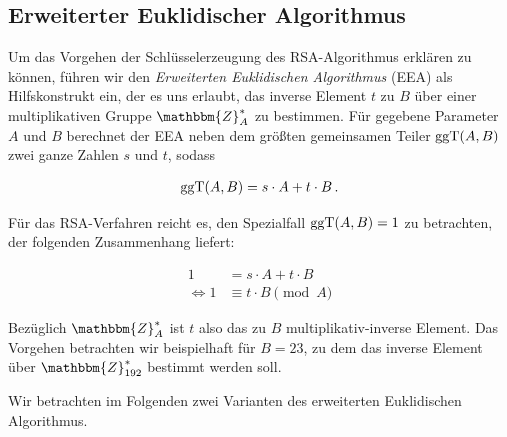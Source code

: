 \subsection{Erweiterter Euklidischer Algorithmus}
\label{ssec:eea}
Um das Vorgehen der Schlüsselerzeugung des RSA-Algorithmus erklären zu
können, führen wir den \emph{Erweiterten Euklidischen Algorithmus} (EEA)
als Hilfskonstrukt ein, der es uns erlaubt, das inverse Element $t$ zu
$B$ über einer multiplikativen Gruppe $\mathbbm{Z}^{\ast}_{A}$ zu
bestimmen. Für gegebene Parameter $A$ und $B$ berechnet der EEA neben
dem größten gemeinsamen Teiler $\operatorname{ggT}(A, B)$ zwei ganze Zahlen $s$ und $t$, sodass 

\begin{align*}
	\operatorname{ggT}(A, B) = s \cdot A + t \cdot B\, .
\end{align*}

Für das RSA-Verfahren reicht es, den Spezialfall $\operatorname{ggT}(A,B) = 1$ zu betrachten, der folgenden Zusammenhang liefert:

\begin{align*}
	1 &= s \cdot A + t \cdot B\\
	\Leftrightarrow 1 &\equiv t \cdot B \pmod A
\end{align*}

Bezüglich $\mathbbm{Z}^*_{A}$ ist $t$ also das zu $B$
multiplikativ-inverse Element. Das Vorgehen betrachten wir beispielhaft
für $B = 23$, zu dem das inverse Element über $\mathbbm{Z}^{\ast}_{192}$
bestimmt werden soll.

Wir betrachten im Folgenden zwei Varianten des erweiterten Euklidischen
Algorithmus.

